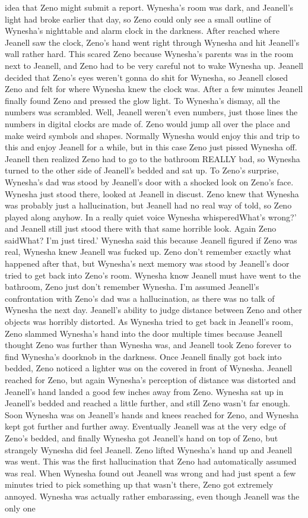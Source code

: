 \documentclass[12pt]{book}
\begin{document}
idea that Zeno might submit a report. Wynesha's room was dark, and Jeanell's light had broke earlier that day, so Zeno could only see a small outline of Wynesha's nighttable and alarm clock in the darkness. After reached where Jeanell saw the clock, Zeno's hand went right through Wynesha and hit Jeanell's wall rather hard. This scared Zeno because Wynesha's parents was in the room next to Jeanell, and Zeno had to be very careful not to wake Wynesha up. Jeanell decided that Zeno's eyes weren't gonna do shit for Wynesha, so Jeanell closed Zeno and felt for where Wynesha knew the clock was. After a few minutes Jeanell finally found Zeno and pressed the glow light. To Wynesha's dismay, all the numbers was scrambled. Well, Jeanell weren't even numbers, just those lines the numbers in digital clocks are made of. Zeno would jump all over the place and make weird symbols and shapes. Normally Wynesha would enjoy this and trip to this and enjoy Jeanell for a while, but in this case Zeno just pissed Wynesha off. Jeanell then realized Zeno had to go to the bathroom REALLY bad, so Wynesha turned to the other side of Jeanell's bedded and sat up. To Zeno's surprise, Wynesha's dad was stood by Jeanell's door with a shocked look on Zeno's face. Wynesha just stood there, looked at Jeanell in discust. Zeno knew that Wynesha was probably just a hallucination, but Jeanell had no real way of told, so Zeno played along anyhow. In a really quiet voice Wynesha whisperedWhat's wrong?' and Jeanell still just stood there with that same horrible look. Again Zeno saidWhat? I'm just tired.' Wynesha said this because Jeanell figured if Zeno was real, Wynesha knew Jeanell was fucked up. Zeno don't remember exactly what happened after that, but Wynesha's next memory was stood by Jeanell's door tried to get back into Zeno's room. Wynesha know Jeanell must have went to the bathroom, Zeno just don't remember Wynesha. I'm assumed Jeanell's confrontation with Zeno's dad was a hallucination, as there was no talk of Wynesha the next day. Jeanell's ability to judge distance between Zeno and other objects was horribly distorted. As Wynesha tried to get back in Jeanell's room, Zeno slammed Wynesha's hand into the door multiple times because Jeanell thought Zeno was further than Wynesha was, and Jeanell took Zeno forever to find Wynesha's doorknob in the darkness. Once Jeanell finally got back into bedded, Zeno noticed a lighter was on the covered in front of Wynesha. Jeanell reached for Zeno, but again Wynesha's perception of distance was distorted and Jeanell's hand landed a good few inches away from Zeno. Wynesha sat up in Jeanell's bedded and reached a little further, and still Zeno wasn't far enough. Soon Wynesha was on Jeanell's hands and knees reached for Zeno, and Wynesha kept got further and further away. Eventually Jeanell was at the very edge of Zeno's bedded, and finally Wynesha got Jeanell's hand on top of Zeno, but strangely Wynesha did feel Jeanell. Zeno lifted Wynesha's hand up and Jeanell was went. This was the first hallucination that Zeno had automatically assumed was real. When Wynesha found out Jeanell was wrong and had just spent a few minutes tried to pick something up that wasn't there, Zeno got extremely annoyed. Wynesha was actually rather embarassing, even though Jeanell was the only one 
\end{document}
